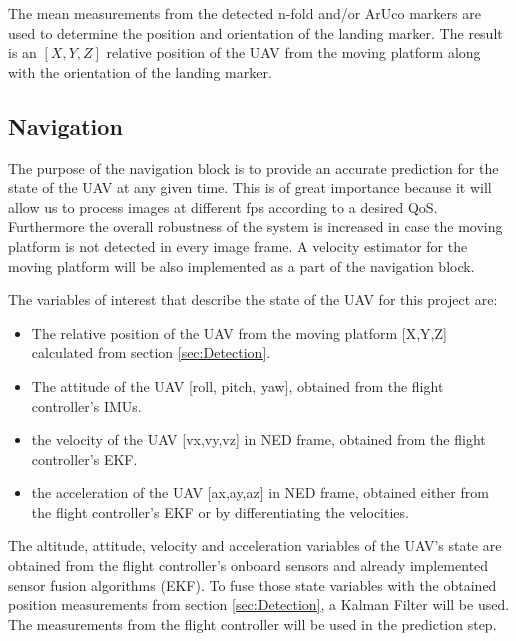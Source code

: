 \documentclass[conference]{IEEEtran}
\begin{document}
The mean measurements from the detected n-fold and/or ArUco markers are used to determine the position and orientation of the landing marker. The result is an $[X,Y,Z]$ relative position of the UAV from the moving platform along with the orientation of the landing marker.


\subsection{Navigation}
\label{sec:Navigation}

The purpose of the navigation block is to provide an accurate prediction for the state of the UAV at any given time. This is of great importance because it will allow us to process images at different fps according to a desired QoS. Furthermore the overall robustness of the system is increased in case the moving platform is not detected in every image frame. A velocity estimator for the moving platform will be also implemented as a part of the navigation block.

The variables of interest that describe the state of the UAV for this project are:

\begin{itemize}

\item The relative position of the UAV from the moving platform [X,Y,Z] calculated from section \ref{sec:Detection}.

\item The attitude of the UAV [roll, pitch, yaw], obtained from the flight controller's IMUs.

\item the velocity of the UAV [vx,vy,vz] in NED frame, obtained from the flight controller's EKF.

\item the acceleration of the UAV [ax,ay,az] in NED frame, obtained either from the flight controller's EKF or by differentiating the velocities.

\end{itemize}

The altitude, attitude, velocity and acceleration variables of the UAV's state are obtained from the flight controller's onboard sensors and already implemented sensor fusion algorithms (EKF). To fuse those state variables with the obtained position measurements from section \ref{sec:Detection}, a Kalman Filter will be used. The measurements from the flight controller will be used in the prediction step.
\end{document}

